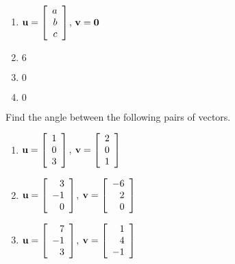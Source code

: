 \begin{multicols}{2}
\begin{ex}
\begin{enumerate}[label={\alph*.}]
\item $\textbf{u} = \left[
\begin{array}{r}
a\\
b\\
c
\end{array}
\right]$, 
$\textbf{v} = \textbf{0} $

\end{enumerate}
\begin{sol}
\begin{enumerate}[label={\alph*.}]
\setcounter{enumi}{1}
\item  $6$

\setcounter{enumi}{3}
\item  $0$

\setcounter{enumi}{5}
\item  $0$

\end{enumerate}
\end{sol}
\end{ex}

\begin{ex}
Find the angle between the following pairs of vectors.


\begin{enumerate}[label={\alph*.}]
\item $\textbf{u} = \left[
\begin{array}{r}
1\\
0\\
3
\end{array}
\right]$, 
$\textbf{v} = \left[
\begin{array}{r}
2\\
0\\
1
\end{array}
\right]
$

\item $\textbf{u} = \left[
\begin{array}{r}
3\\
-1\\
0
\end{array}
\right]$, 
$\textbf{v} = \left[
\begin{array}{r}
-6\\
2\\
0
\end{array}
\right]
$

\item $\textbf{u} = \left[
\begin{array}{r}
7\\
-1\\
3
\end{array}
\right]$, 
$\textbf{v} = \left[
\begin{array}{r}
1\\
4\\
-1
\end{array}
\right]
$


\end{enumerate}
\end{ex}
\end{multicols}
